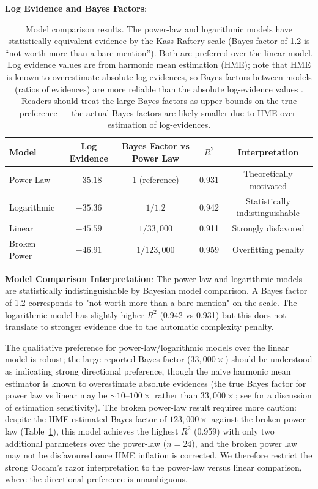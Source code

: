 \documentclass[usenatbib]{rasti}
\begin{document}
\textbf{Log Evidence and Bayes Factors}:
\begin{table}
\caption{Model comparison results. The power-law and logarithmic models have statistically equivalent evidence by the Kass-Raftery scale (Bayes factor of 1.2 is ``not worth more than a bare mention''). Both are preferred over the linear model. Log evidence values are from harmonic mean estimation (HME); note that HME is known to overestimate absolute log-evidences, so Bayes factors between models (ratios of evidences) are more reliable than the absolute log-evidence values \citep{kass1995}. Readers should treat the large Bayes factors as upper bounds on the true preference --- the actual Bayes factors are likely smaller due to HME over-estimation of log-evidences.}
\label{tab:model_comparison}
\centering
\begin{tabular}{lcccc}
\hline
Model & Log Evidence & Bayes Factor vs Power Law & $R^2$ & Interpretation \\
\hline
Power Law & $-35.18$ & 1 (reference) & 0.931 & Theoretically motivated \\
Logarithmic & $-35.36$ & $1/1.2$ & 0.942 & Statistically indistinguishable \\
Linear & $-45.59$ & $1/33,\!000$ & 0.911 & Strongly disfavored \\
Broken Power & $-46.91$ & $1/123,\!000$ & 0.959 & Overfitting penalty \\
\hline
\end{tabular}
\end{table}

\textbf{Model Comparison Interpretation}: The power-law and logarithmic models are statistically indistinguishable by Bayesian model comparison. A Bayes factor of 1.2 corresponds to "not worth more than a bare mention" on the \citet{kass1995} scale. The logarithmic model has slightly higher $R^2$ (0.942 vs 0.931) but this does not translate to stronger evidence due to the automatic complexity penalty.

The qualitative preference for power-law/logarithmic models over the linear model is robust; the large reported Bayes factor ($33{,}000\times$) should be understood as indicating strong directional preference, though the naive harmonic mean estimator is known to overestimate absolute evidences (the true Bayes factor for power law vs linear may be $\sim 10$--$100\times$ rather than $33{,}000\times$; see \citet{kass1995} for a discussion of estimation sensitivity). The broken power-law result requires more caution: despite the HME-estimated Bayes factor of $123{,}000\times$ against the broken power law (Table~\ref{tab:model_comparison}), this model achieves the highest $R^2$ (0.959) with only two additional parameters over the power-law ($n = 24$), and the broken power law may not be disfavoured once HME inflation is corrected. We therefore restrict the strong Occam's razor interpretation to the power-law versus linear comparison, where the directional preference is unambiguous.
\end{document}
